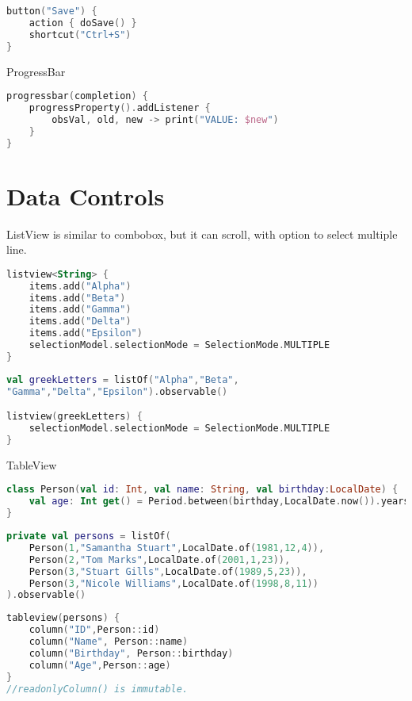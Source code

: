 \documentclass[12pt]{article}
\begin{document}
\begin{lstlisting}[language=Kotlin]
button("Save") {
	action { doSave() }
	shortcut("Ctrl+S")
}
\end{lstlisting}
ProgressBar
\begin{lstlisting}[language=Kotlin]
progressbar(completion) {
    progressProperty().addListener {
        obsVal, old, new -> print("VALUE: $new")
    }
}
\end{lstlisting}




\section{Data Controls}

ListView is similar to combobox, but it can scroll, with option to select multiple line.
\begin{lstlisting}[language=Kotlin]
listview<String> {
	items.add("Alpha")
	items.add("Beta")
	items.add("Gamma")
	items.add("Delta")
	items.add("Epsilon")
	selectionModel.selectionMode = SelectionMode.MULTIPLE
}
\end{lstlisting}

\begin{lstlisting}[language=Kotlin]
val greekLetters = listOf("Alpha","Beta",
"Gamma","Delta","Epsilon").observable()

listview(greekLetters) {
	selectionModel.selectionMode = SelectionMode.MULTIPLE
}
\end{lstlisting}
TableView

\begin{lstlisting}[language=Kotlin]
class Person(val id: Int, val name: String, val birthday:LocalDate) {
	val age: Int get() = Period.between(birthday,LocalDate.now()).years
}
\end{lstlisting}

\begin{lstlisting}[language=Kotlin]
private val persons = listOf(
	Person(1,"Samantha Stuart",LocalDate.of(1981,12,4)),
	Person(2,"Tom Marks",LocalDate.of(2001,1,23)),
	Person(3,"Stuart Gills",LocalDate.of(1989,5,23)),
	Person(3,"Nicole Williams",LocalDate.of(1998,8,11))
).observable()
\end{lstlisting}

\begin{lstlisting}[language=Kotlin]
tableview(persons) {
	column("ID",Person::id)
	column("Name", Person::name)
	column("Birthday", Person::birthday)
	column("Age",Person::age)
}
//readonlyColumn() is immutable.
\end{lstlisting}
\end{document}
